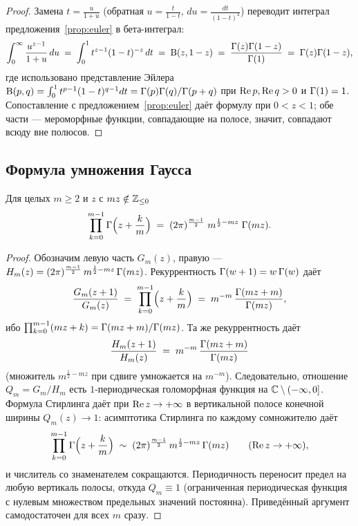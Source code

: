 \begin{proof}
Замена $t=\frac{u}{1+u}$ (обратная $u=\frac{t}{1-t}$,
$du=\frac{dt}{(1-t)^2}$) переводит интеграл
предложения~\ref{prop:euler} в бета-интеграл:
\[
  \int_0^\infty\frac{u^{z-1}}{1+u}\,du
  \;=\;\int_0^1 t^{z-1}(1-t)^{-z}\,dt
  \;=\;\mathrm{B}(z,1-z)
  \;=\;\frac{\Gamma(z)\Gamma(1-z)}{\Gamma(1)}
  \;=\;\Gamma(z)\Gamma(1-z),
\]
где использовано представление Эйлера
$\mathrm{B}(p,q)=\int_0^1t^{p-1}(1-t)^{q-1}dt=\Gamma(p)\Gamma(q)/\Gamma(p+q)$ при
$\operatorname{Re} p,\operatorname{Re} q>0$ и $\Gamma(1)=1$. Сопоставление с
предложением~\ref{prop:euler} даёт формулу при $0<z<1$; обе части ---
мероморфные функции, совпадающие на полосе, значит, совпадают всюду
вне полюсов.
\end{proof}

\subsection{Формула умножения Гаусса}

\begin{proposition}\label{prop:mult}
Для целых $m\ge2$ и $z$ с $mz\notin\mathbb{Z}_{\le0}$
\[
  \prod_{k=0}^{m-1}\Gamma\Bigl(z+\frac{k}{m}\Bigr)
  \;=\;(2\pi)^{\frac{m-1}{2}}\;m^{\frac12-mz}\;\Gamma(mz).
\]
\end{proposition}

\begin{proof}
Обозначим левую часть $G_m(z)$, правую ---
$H_m(z)=(2\pi)^{\frac{m-1}{2}}\,m^{\frac12-mz}\,\Gamma(mz)$.
Рекуррентность $\Gamma(w+1)=w\,\Gamma(w)$ даёт
\[
  \frac{G_m(z+1)}{G_m(z)}
  \;=\;\prod_{k=0}^{m-1}\Bigl(z+\frac{k}{m}\Bigr)
  \;=\;m^{-m}\,\frac{\Gamma(mz+m)}{\Gamma(mz)},
\]
ибо $\prod_{k=0}^{m-1}(mz+k)=\Gamma(mz+m)/\Gamma(mz)$. Та же рекуррентность
даёт
\[
  \frac{H_m(z+1)}{H_m(z)}
  \;=\;m^{-m}\,\frac{\Gamma(mz+m)}{\Gamma(mz)}
\]
(множитель $m^{\frac12-mz}$ при сдвиге умножается на $m^{-m}$).
Следовательно, отношение $Q_m=G_m/H_m$ есть $1$-периодическая
голоморфная функция на $\mathbb{C}\setminus(-\infty,0]$. Формула Стирлинга
даёт при $\operatorname{Re} z\to+\infty$ в вертикальной полосе конечной ширины
$Q_m(z)\to1$: асимптотика Стирлинга по каждому сомножителю даёт
\[
  \prod_{k=0}^{m-1}\Gamma\Bigl(z+\frac{k}{m}\Bigr)
  \;\sim\;(2\pi)^{\frac{m-1}{2}}\,m^{\frac12-mz}\,\Gamma(mz)
  \qquad(\operatorname{Re} z\to+\infty),
\]
и числитель со знаменателем сокращаются. Периодичность переносит
предел на любую вертикаль полосы, откуда $Q_m\equiv1$ (ограниченная
периодическая функция с нулевым множеством предельных значений
постоянна). Приведённый аргумент самодостаточен для всех $m$ сразу.
\end{proof}

